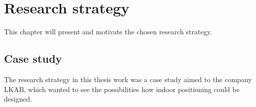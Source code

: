 \section{Research strategy}\label{sec:methodResearch}
This chapter will present and motivate the chosen research strategy.

\subsection{Case study}\label{sec:methodResearchCaseStudy}
The research strategy in this thesis work was a case study aimed to the company
LKAB, which wanted to see the possibilities how indoor positioning could be
designed.





